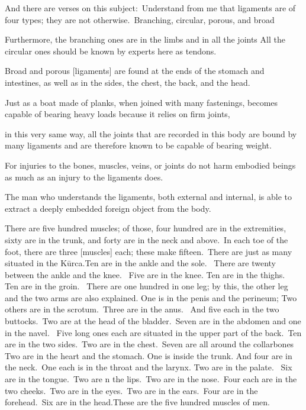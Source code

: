 \begin{translation}
\begin{tt}
\item[30]
And there are verses on this subject: Understand from me that ligaments are of four types; they are not otherwise. Branching, circular, porous, and broad

\item[31]
Furthermore, the branching ones are in the limbs and in all the joints All the circular ones should be known by experts here as tendons. 
\item[32]
Broad and porous [ligaments] are found at the ends of the stomach and intestines, as well as in the sides, the chest, the back, and the head.

\item[33]
Just as a boat made of planks, when joined with many fastenings, becomes capable of bearing heavy loads because it relies on firm joints, 

\item[34]
in this very same way, all the joints that are recorded in this body are bound by many ligaments and are therefore known to be capable of bearing weight. 


\item[35]
For injuries to the bones, muscles, veins, or joints do not harm embodied beings as much as an injury to the ligaments does. 

\item[36]
The man who understands the ligaments, both external and internal, is able to extract a deeply embedded foreign object from the body. 

\item[37]
There are five hundred muscles; of those, four hundred are in the extremities, sixty are in the trunk, and forty are in the neck and above. In each toe of the foot, there are three [muscles] each; these make fifteen. There are just as many situated in the Kūrca.Ten are in the ankle and the sole.  There are twenty between the ankle and the knee.  Five are in the knee. Ten are in the thighs.  Ten are in the groin.  There are one hundred in one leg; by this, the other leg and the two arms are also explained. One is in the penis and the perineum; Two others are in the scrotum. Three are in the anus.  And five each in the two buttocks. Two are at the head of the bladder. Seven are in the abdomen and one in the navel.  Five long ones each are situated in the upper part of the back. Ten are in the two sides. Two are in the chest. Seven are all around the collarbones Two are in the heart and the stomach. One is inside the trunk. And four are in the neck. One each is in the throat and the larynx. Two are in the palate.  Six are in the tongue. Two are  n the lips. Two are in the nose. Four each are in the two cheeks. Two are in the eyes. Two are in the ears. Four are in the forehead. Six are in the head.These are the five hundred muscles of men. 


\end{tt}
\end{translation}
